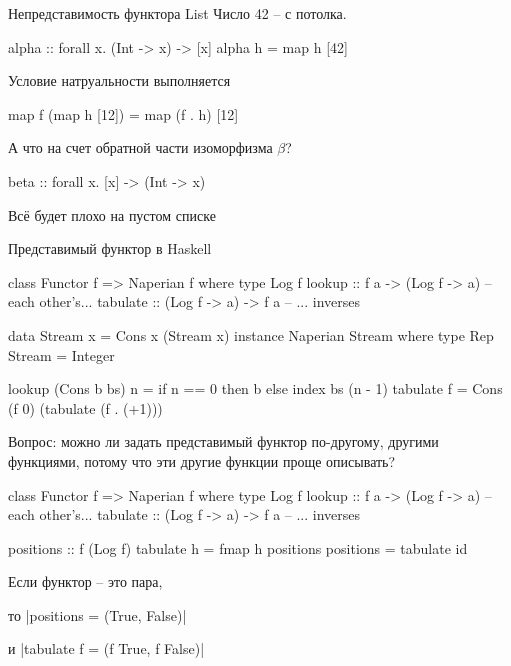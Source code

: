 \documentclass[
  russian,
  aspectratio=169,
  xcolor={svgnames},
  hyperref={colorlinks,citecolor=DeepPink4,linkcolor=DarkRed,urlcolor=DarkBlue}]{beamer}
\begin{document}
\begin{frame}[fragile]{Непредставимость функтора List}
Число 42 -- с потолка.
 
 \begin{hslisting}
  alpha :: forall x. (Int -> x) -> [x]
  alpha h = map h [42]
 \end{hslisting}
 
 Условие натруальности выполняется
 \begin{hslisting}
  map f (map h [12]) = map (f . h) [12]
 \end{hslisting}
 А что на счет обратной части изоморфизма $\beta$?
 \begin{hslisting}
 beta :: forall x. [x] -> (Int -> x)
 \end{hslisting}
 Всё будет плохо на пустом списке
\end{frame}

\begin{frame}[fragile]{Представимый функтор в Haskell}
 \begin{hslisting}
  class Functor f => Naperian f where
    type Log f
    lookup   :: f a -> (Log f -> a)  -- each other's...
    tabulate :: (Log f -> a) -> f a  -- ... inverses

  data Stream x = Cons x (Stream x)
  instance Naperian Stream where
    type Rep Stream = Integer

    lookup (Cons b bs) n = 
      if n == 0 then b
      else index bs (n - 1)
    tabulate f = Cons (f 0) (tabulate (f . (+1)))
 \end{hslisting}\pause

Вопрос: можно ли задать представимый функтор по-другому, другими функциями, потому что эти другие функции проще описывать?

\end{frame}

\begin{frame}[fragile]
\begin{hslisting}
  class Functor f => Naperian f where
    type Log f
    lookup   :: f a -> (Log f -> a)  -- each other's...
    tabulate :: (Log f -> a) -> f a  -- ... inverses
    
    positions :: f (Log f)
    tabulate h = fmap h positions
    positions = tabulate id
\end{hslisting}\vspace{0.5cm}

Если функтор -- это пара, 

то \hsinline|positions = (True, False)|

и \hsinline|tabulate f = (f True, f False)|

\end{frame}
\end{document}
